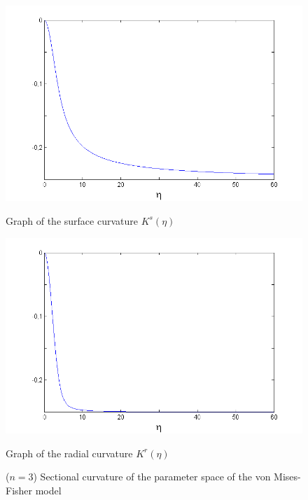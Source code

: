 \documentclass{svmult}
\begin{document}
\begin{figure} [!b]
\centering
  \centering
  \includegraphics[width=0.9\linewidth]{Figures/n3ks1}
  \caption*{Graph of the surface curvature $K^s(\eta)$}
  \centering
  \includegraphics[width=0.9\linewidth]{Figures/n3kr1}
  \caption*{Graph of the radial curvature $K^r(\eta)$}
\caption{($n = 3$) Sectional curvature of the parameter space of the von Mises-Fisher model}
\label{fig1}
\end{figure}
    
\end{document}
